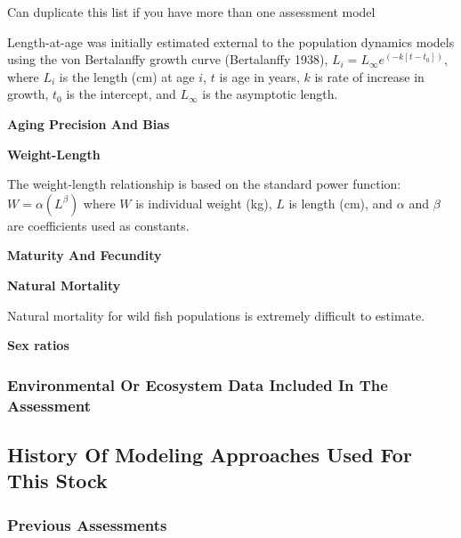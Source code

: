 \documentclass[12pt,]{article}
\begin{document}
Can duplicate this list if you have more than one assessment model

Length-at-age was initially estimated external to the population
dynamics models using the von Bertalanffy growth curve (Bertalanffy
1938), \(L_i = L_{\infty}e^{(-k[t-t_0])}\), where \(L_i\) is the length
(cm) at age \(i\), \(t\) is age in years, \(k\) is rate of increase in
growth, \(t_0\) is the intercept, and \(L_{\infty}\) is the asymptotic
length.

\vspace{.5cm}

\textbf{Aging Precision And Bias}

\vspace{.5cm}

\textbf{Weight-Length}

The weight-length relationship is based on the standard power function:
\(W = \alpha(L^\beta)\) where \(W\) is individual weight (kg), \(L\) is
length (cm), and \(\alpha\) and \(\beta\) are coefficients used as
constants.

\vspace{.5cm}

\textbf{Maturity And Fecundity}

\vspace{.5cm}

\textbf{Natural Mortality}

Natural mortality for wild fish populations is extremely difficult to
estimate.

\vspace{.5cm}

\textbf{Sex ratios}

\subsubsection{Environmental Or Ecosystem Data Included In The
Assessment}\label{environmental-or-ecosystem-data-included-in-the-assessment}

\subsection{History Of Modeling Approaches Used For This
Stock}\label{history-of-modeling-approaches-used-for-this-stock}

\subsubsection{Previous Assessments}\label{previous-assessments}
\end{document}
